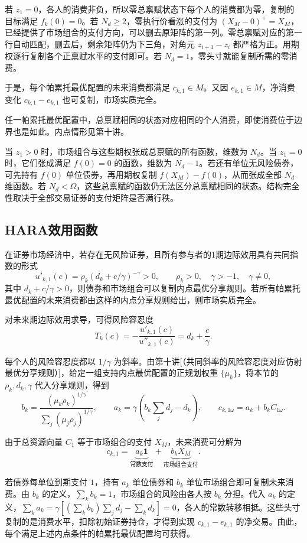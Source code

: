 \begin{solution}[label-content={证明},blank-type=none]
若 $z_1=0$，各人的消费非负，所以零总禀赋状态下每个人的消费都为零，复制的目标满足 $f_k(0)=0$。若 $N_d\ge2$，零执行价看涨的支付为 $(X_M-0)^+=X_M$，已经提供了市场组合的支付方向，可以删去原矩阵的第一列。零总禀赋对应的第一行自动匹配，删去后，剩余矩阵仍为下三角，对角元 $z_{i+1}-z_i$ 都严格为正。用期权逐行复制各个正禀赋水平的支付即可。若 $N_d=1$，零头寸就能复制所需的零消费。

于是，每个帕累托最优配置的未来消费都满足 $c_{k,1}\in M$。又因 $e_{k,1}\in M$，净消费变化 $c_{k,1}-e_{k,1}$ 也可复制，市场实质完全。
\end{solution}

任一帕累托最优配置中，总禀赋相同的状态对应相同的个人消费，即使消费位于边界也是如此。内点情形见第十讲。

当 $z_1>0$ 时，市场组合与这些期权张成总禀赋的所有函数，维数为 $N_d$。当 $z_1=0$ 时，它们张成满足 $f(0)=0$ 的函数，维数为 $N_d-1$。若还有单位无风险债券，可先持有 $f(0)$ 单位债券，再用期权复制 $f(X_M)-f(0)$，从而张成全部 $N_d$ 维函数。若 $N_d<\Omega$，这些总禀赋的函数仍无法区分总禀赋相同的状态。结构完全性取决于全部交易证券的支付矩阵是否满行秩。

\subsection{HARA效用函数}
\begin{tcolorbox}[knowledge]
 在证券市场经济中，若存在无风险证券，且所有参与者的1期边际效用具有共同指数的形式
\[
 u'_{k,1}(c)=\rho_k(d_k+c/\gamma)^{-\gamma}>0,
 \qquad\rho_k>0,\quad\gamma>-1,\quad\gamma\ne0,
\]
其中 $d_k+c/\gamma>0$，则债券和市场组合可以复制内点最优分享规则。若所有帕累托最优配置的未来消费都由这样的内点分享规则给出，则市场实质完全。
\end{tcolorbox}

\begin{solution}[label-content={证明},blank-type=none]
对未来期边际效用求导，可得风险容忍度
\[
 T_k(c)=-\frac{u'_{k,1}(c)}{u''_{k,1}(c)}=d_k+\frac{c}{\gamma}.
\]

每个人的风险容忍度都以 $1/\gamma$ 为斜率。由第十讲[（共同斜率的风险容忍度对应仿射最优分享规则）]，给定一组支持内点最优配置的正规划权重 $\{\mu_k\}$，将本节的 $\rho_k,d_k,\gamma$ 代入分享规则，得到
\[
 b_k=\frac{(\mu_k\rho_k)^{1/\gamma}}
           {\sum_j(\mu_j\rho_j)^{1/\gamma}},
 \qquad
 a_k=\gamma\left(b_k\sum_jd_j-d_k\right),
 \qquad
 c_{k,1\omega}=a_k+b_kC_{1\omega}.
\]

由于总资源向量 $C_1$ 等于市场组合的支付 $X_M$，未来消费可分解为
\[
 c_{k,1}
 =\underbrace{a_k\mathbf1}_{\text{常数支付}}
 +\underbrace{b_k X_M}_{\text{市场组合支付}}.
\]

若债券每单位到期支付 $1$，持有 $a_k$ 单位债券和 $b_k$ 单位市场组合即可复制未来消费。由 $b_k$ 的定义，$\sum_k b_k=1$，市场组合的风险由各人按 $b_k$ 分担。代入 $a_k$ 的定义，$\sum_k a_k=\gamma[(\sum_k b_k)\sum_j d_j-\sum_k d_k]=0$，各人的常数转移相抵。这些头寸复制的是消费水平，扣除初始证券持仓，才得到实现 $c_{k,1}-e_{k,1}$ 的净交易。由此，每个满足上述内点条件的帕累托最优配置均可获得。
\end{solution}

